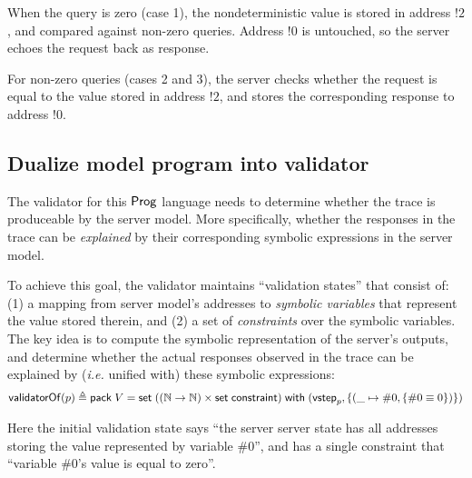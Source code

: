 When the query is zero (case 1), the nondeterministic value is stored in address
$!2$, and compared against non-zero queries.  Address $!0$ is untouched, so the
server echoes the request back as response.

For non-zero queries (cases 2 and 3), the server checks whether the request is
equal to the value stored in address $!2$, and stores the corresponding response
to address $!0$.

\subsection{Dualize model program into validator}
The validator for this $\mathsf{Prog}$ language needs to determine whether the trace is
produceable by the server model.  More specifically, whether the responses in
the trace can be {\em explained} by their corresponding symbolic expressions in
the server model.

To achieve this goal, the validator maintains ``validation states'' that consist
of: (1) a mapping from server model's addresses to {\em symbolic variables} that
represent the value stored therein, and (2) a set of {\em constraints} over the
symbolic variables.  The key idea is to compute the symbolic representation of
the server's outputs, and determine whether the actual responses observed in the
trace can be explained by ({\it i.e.} unified with) these symbolic expressions:
\[\mathsf{validatorOf}(p)\triangleq\mathsf{pack}\;V=\mathsf{set}\;((\mathbb N\to\mathbb N)\times\mathsf{set}\;\mathsf{constraint})\;\mathsf{with}\;(\mathsf{vstep}_p,\{(\_\mapsto\#0,\{\#0\equiv0\})\})\]

Here the initial validation state says ``the server server state has all
addresses storing the value represented by variable $\#0$'', and has a single
constraint that ``variable $\#0$'s value is equal to zero''.

